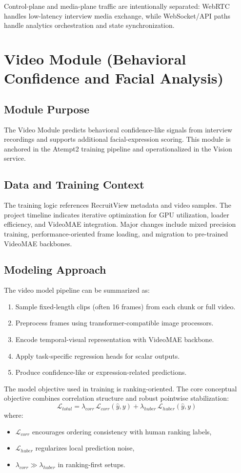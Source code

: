 \documentclass[12pt,a4paper]{report}
\begin{document}
Control-plane and media-plane traffic are intentionally separated: WebRTC handles low-latency interview media exchange, while WebSocket/API paths handle analytics orchestration and state synchronization.

\chapter{Video Module (Behavioral Confidence and Facial Analysis)}
\section{Module Purpose}
The Video Module predicts behavioral confidence-like signals from interview recordings and supports additional facial-expression scoring. This module is anchored in the Atempt2 training pipeline and operationalized in the Vision service.

\section{Data and Training Context}
The training logic references RecruitView metadata and video samples. The project timeline indicates iterative optimization for GPU utilization, loader efficiency, and VideoMAE integration. Major changes include mixed precision training, performance-oriented frame loading, and migration to pre-trained VideoMAE backbones.

\section{Modeling Approach}
The video model pipeline can be summarized as:
\begin{enumerate}[leftmargin=1.5em]
\item Sample fixed-length clips (often 16 frames) from each chunk or full video.
\item Preprocess frames using transformer-compatible image processors.
\item Encode temporal-visual representation with VideoMAE backbone.
\item Apply task-specific regression heads for scalar outputs.
\item Produce confidence-like or expression-related predictions.
\end{enumerate}

The model objective used in training is ranking-oriented. The core conceptual objective combines correlation structure and robust pointwise stabilization:
\begin{equation}
\mathcal{L}_{total} = \lambda_{corr}\,\mathcal{L}_{corr}(\hat{y}, y) + \lambda_{huber}\,\mathcal{L}_{huber}(\hat{y}, y)
\end{equation}
where:
\begin{itemize}[leftmargin=1.5em]
\item $\mathcal{L}_{corr}$ encourages ordering consistency with human ranking labels,
\item $\mathcal{L}_{huber}$ regularizes local prediction noise,
\item $\lambda_{corr} \gg \lambda_{huber}$ in ranking-first setups.
\end{itemize}
\end{document}
